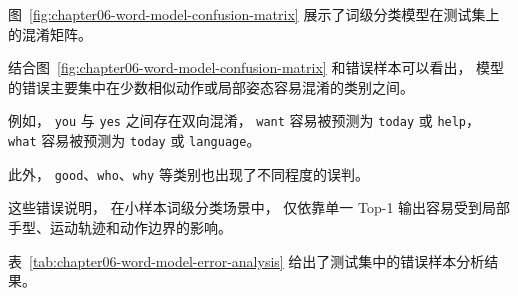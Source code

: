 图~\ref{fig:chapter06-word-model-confusion-matrix} 展示了词级分类模型在测试集上的混淆矩阵。


结合图~\ref{fig:chapter06-word-model-confusion-matrix} 和错误样本可以看出，
模型的错误主要集中在少数相似动作或局部姿态容易混淆的类别之间。

例如，
\texttt{you} 与 \texttt{yes} 之间存在双向混淆，
\texttt{want} 容易被预测为 \texttt{today} 或 \texttt{help}，
\texttt{what} 容易被预测为 \texttt{today} 或 \texttt{language}。

此外，
\texttt{good}、\texttt{who}、\texttt{why} 等类别也出现了不同程度的误判。

这些错误说明，
在小样本词级分类场景中，
仅依靠单一 Top-1 输出容易受到局部手型、运动轨迹和动作边界的影响。

表~\ref{tab:chapter06-word-model-error-analysis} 给出了测试集中的错误样本分析结果。

